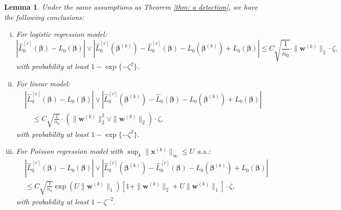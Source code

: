 \documentclass[12pt]{article}
\newcommand{\infnorm}[1]{\|#1\|_{\infty}}
\newcommand{\twonorm}[1]{\|#1\|_{2}}
\newcommand{\onenorm}[1]{\|#1\|_{1}}
\newcommand{\norm}[1]{|#1|}
\newcommand{\bbeta}{\bm{\beta}}
\newcommand{\bbetak}[1]{\bm{\beta}^{(#1)}}
\newcommand{\bxk}[1]{\bm{x}^{(#1)}}
\newcommand{\bwk}[1]{\bm{w}^{(#1)}}
\newcommand{\<}{\langle}
\renewcommand{\>}{\rangle}
\newtheorem{lemma}{Lemma}
\begin{document}
\begin{lemma}\label{lem: gamma_2 rate}
		Under the same assumptions as Theorem \ref{thm: a detection}, we have the following conclusions:
	\begin{enumerate}[(i)]
		\item For logistic regression model: 
		\begin{equation}
			\norm{\hat{L}_0^{[r]}(\bbeta) - L_0(\bbeta)} \vee \norm{\hat{L}_0^{[r]}(\bbetak{k})-\hat{L}_0^{[r]}(\bbeta)-L_0(\bbetak{k})+L_0(\bbeta)} \leq C\sqrt{\frac{1}{n_0}}\cdot \twonorm{\bwk{k}}\cdot \zeta,
		\end{equation}
		with probability at least $1-\exp\{-\zeta^2\}$.
		\item For linear model:
		\begin{align}
			&\norm{\hat{L}_0^{[r]}(\bbeta) - L_0(\bbeta)} \vee \norm{\hat{L}_0^{[r]}(\bbetak{k})-\hat{L}_0(\bbeta)-L_0(\bbetak{k})+L_0(\bbeta)} \\
			&\quad \leq C\sqrt{\frac{1}{n_0}}\cdot (\twonorm{\bwk{k}}^2 \vee \twonorm{\bwk{k}})\cdot \zeta,
		\end{align}
		with probability at least $1-\exp\{-\zeta^2\}$.
		\item For Poisson regression model with $\sup_k \infnorm{\bxk{k}} \leq U$ a.s.:
		\begin{align}
			&\norm{\hat{L}_0^{[r]}(\bbeta) - L_0(\bbeta)} \vee \norm{\hat{L}_0^{[r]}(\bbetak{k})-\hat{L}_0^{[r]}(\bbeta)-L_0(\bbetak{k})+L_0(\bbeta)} \\
			&\leq C\sqrt{\frac{1}{n_0}}\exp\left(U\onenorm{\bwk{k}}\right) \left[1 
		+ \twonorm{\bwk{k}} + U\onenorm{\bwk{k}} \right]\cdot \zeta,
		\end{align}
		with probability at least $1-\zeta^{-2}$.
	\end{enumerate}
\end{lemma}
\end{document}
